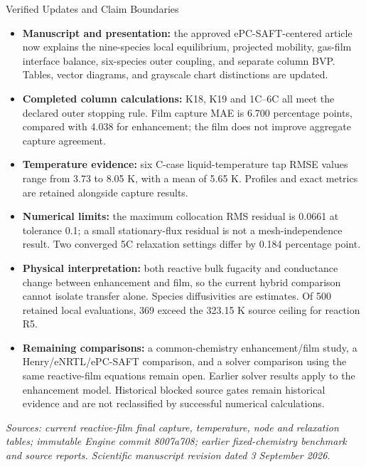 \documentclass[10pt,landscape,letterpaper]{article}
\begin{document}
\vspace{9pt}
{\color{navy}\Large Verified Updates and Claim Boundaries\par}
\vspace{3pt}
\begin{itemize}[leftmargin=0.18in,itemsep=3pt,topsep=2pt]
\item \textbf{Manuscript and presentation:} the approved ePC-SAFT-centered article now explains the nine-species local equilibrium, projected mobility, gas-film interface balance, six-species outer coupling, and separate column BVP. Tables, vector diagrams, and grayscale chart distinctions are updated.
\item \textbf{Completed column calculations:} K18, K19 and 1C--6C all meet the declared outer stopping rule. Film capture MAE is 6.700 percentage points, compared with 4.038 for enhancement; the film does not improve aggregate capture agreement.
\item \textbf{Temperature evidence:} six C-case liquid-temperature tap RMSE values range from 3.73 to 8.05 K, with a mean of 5.65 K. Profiles and exact metrics are retained alongside capture results.
\item \textbf{Numerical limits:} the maximum collocation RMS residual is 0.0661 at tolerance 0.1; a small stationary-flux residual is not a mesh-independence result. Two converged 5C relaxation settings differ by 0.184 percentage point.
\item \textbf{Physical interpretation:} both reactive bulk fugacity and conductance change between enhancement and film, so the current hybrid comparison cannot isolate transfer alone. Species diffusivities are estimates. Of 500 retained local evaluations, 369 exceed the 323.15 K source ceiling for reaction R5.
\item \textbf{Remaining comparisons:} a common-chemistry enhancement/film study, a Henry/eNRTL/ePC-SAFT comparison, and a solver comparison using the same reactive-film equations remain open. Earlier solver results apply to the enhancement model. Historical blocked source gates remain historical evidence and are not reclassified by successful numerical calculations.
\end{itemize}

\vspace{4pt}
\noindent{}

\vfill
\scriptsize\textit{Sources: current reactive-film final capture, temperature, node and relaxation tables; immutable Engine commit 8007a708; earlier fixed-chemistry benchmark and source reports. Scientific manuscript revision dated 3 September 2026.}
\end{document}
